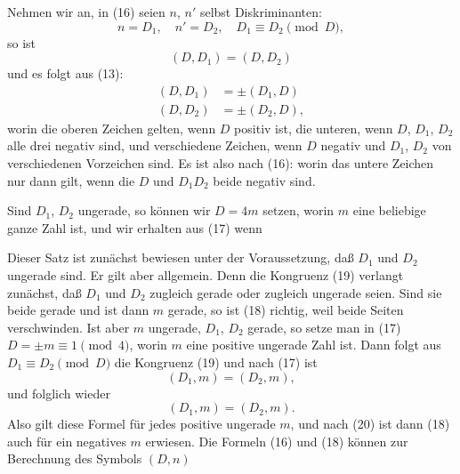 Nehmen wir an, in (16) seien $n$, $n'$ selbst Diskriminanten:
\[
n = D_1, \quad n' = D_2, \quad D_1 \equiv D_2 \pmod{D},
\]
so ist
\[
(D, D_1) = (D, D_2)
\]
und es folgt aus (13):
\[
\begin{aligned}
(D, D_1) &= \pm(D_1, D) \\
(D, D_2) &= \pm(D_2, D),
\end{aligned}
\]
worin die oberen Zeichen gelten, wenn $D$ positiv ist, die unteren, wenn $D$, $D_1$, $D_2$ alle drei negativ sind, und verschiedene Zeichen, wenn $D$ negativ und $D_1$, $D_2$ von verschiedenen Vorzeichen sind. Es ist also nach (16):
worin das untere Zeichen nur dann gilt, wenn die  $D$ und $D_1 D_2$ beide negativ sind.

Sind $D_1$, $D_2$ ungerade, so können wir $D = 4m$ setzen, worin $m$ eine beliebige ganze Zahl ist, und wir erhalten aus (17)
wenn

Dieser Satz ist zunächst bewiesen unter der Voraussetzung, daß $D_1$ und $D_2$ ungerade sind. Er gilt aber allgemein. Denn die Kongruenz (19) verlangt zunächst, daß $D_1$ und $D_2$ zugleich gerade oder zugleich ungerade seien. Sind sie beide gerade und ist dann $m$ gerade, so ist (18) richtig, weil beide Seiten verschwinden. Ist aber $m$ ungerade, $D_1$, $D_2$ gerade, so setze man in (17) $D = \pm m \equiv 1 \pmod{4}$, worin $m$ eine positive ungerade Zahl ist. Dann folgt aus $D_1 \equiv D_2 \pmod{D}$ die Kongruenz (19) und nach (17) ist
\[
(D_1, m) = (D_2, m),
\]
und folglich wieder
\[
(D_1, m) = (D_2, m).
\]
Also gilt diese Formel für jedes positive ungerade $m$, und nach (20) ist dann (18) auch für ein negatives $m$ erwiesen. Die Formeln (16) und (18) können zur Berechnung des Symbols $(D, n)$
